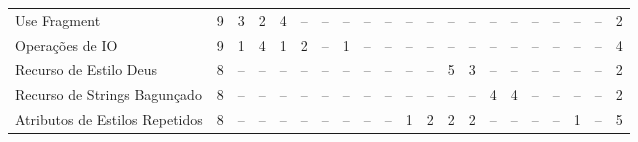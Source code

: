 \begin{table*}[t]
\begin{tabular}{@{}p{3.8cm}p{0.3cm}p{.2cm}p{.2cm}p{.2cm}p{.2cm}p{.2cm}p{.2cm}p{.2cm}p{.2cm}p{.2cm}p{.4cm}p{.4cm}p{.4cm}p{.4cm}p{.4cm}p{.4cm}p{.4cm}p{.4cm}p{.4cm}p{0.2cm}@{}}
Use Fragment					& \multicolumn{1}{c}{9} 	& \multicolumn{1}{c}{3} 	& \multicolumn{1}{c}{2} 	& \multicolumn{1}{c}{4}	 	& \multicolumn{1}{c}{--} 	& \multicolumn{1}{c}{--} 	& \multicolumn{1}{c}{--} 	& \multicolumn{1}{c}{--} 	& \multicolumn{1}{c}{--} 	& \multicolumn{1}{c}{--} 	& \multicolumn{1}{c}{--} 	& \multicolumn{1}{c}{--} 	& \multicolumn{1}{c}{--} 	& \multicolumn{1}{c}{--} 	& \multicolumn{1}{c}{--} 	& \multicolumn{1}{c}{--}	& \multicolumn{1}{c}{--} 	& \multicolumn{1}{c}{--} 	& \multicolumn{1}{c}{--} 	& \multicolumn{1}{c}{2} \\
Operações de IO					& \multicolumn{1}{c}{9} 	& \multicolumn{1}{c}{1} 	& \multicolumn{1}{c}{4} 	& \multicolumn{1}{c}{1}	 	& \multicolumn{1}{c}{2} 	& \multicolumn{1}{c}{--} 	& \multicolumn{1}{c}{1} 	& \multicolumn{1}{c}{--} 	& \multicolumn{1}{c}{--} 	& \multicolumn{1}{c}{--} 	& \multicolumn{1}{c}{--} 	& \multicolumn{1}{c}{--} 	& \multicolumn{1}{c}{--} 	& \multicolumn{1}{c}{--} 	& \multicolumn{1}{c}{--} 	& \multicolumn{1}{c}{--}	& \multicolumn{1}{c}{--} 	& \multicolumn{1}{c}{--} 	& \multicolumn{1}{c}{--} 	& \multicolumn{1}{c}{4} \\
Recurso de Estilo Deus			& \multicolumn{1}{c}{8} 	& \multicolumn{1}{c}{--} 	& \multicolumn{1}{c}{--} 	& \multicolumn{1}{c}{--} 	& \multicolumn{1}{c}{--} 	& \multicolumn{1}{c}{--} 	& \multicolumn{1}{c}{--} 	& \multicolumn{1}{c}{--} 	& \multicolumn{1}{c}{--} 	& \multicolumn{1}{c}{--} 	& \multicolumn{1}{c}{--} 	& \multicolumn{1}{c}{5} 	& \multicolumn{1}{c}{3} 	& \multicolumn{1}{c}{--} 	& \multicolumn{1}{c}{--} 	& \multicolumn{1}{c}{--}	& \multicolumn{1}{c}{--} 	& \multicolumn{1}{c}{--} 	& \multicolumn{1}{c}{--} 	& \multicolumn{1}{c}{2} \\
Recurso de Strings Bagunçado	& \multicolumn{1}{c}{8} 	& \multicolumn{1}{c}{--} 	& \multicolumn{1}{c}{--} 	& \multicolumn{1}{c}{--} 	& \multicolumn{1}{c}{--} 	& \multicolumn{1}{c}{--} 	& \multicolumn{1}{c}{--} 	& \multicolumn{1}{c}{--} 	& \multicolumn{1}{c}{--} 	& \multicolumn{1}{c}{--} 	& \multicolumn{1}{c}{--} 	& \multicolumn{1}{c}{--} 	& \multicolumn{1}{c}{--} 	& \multicolumn{1}{c}{4} 	& \multicolumn{1}{c}{4} 	& \multicolumn{1}{c}{--}	& \multicolumn{1}{c}{--} 	& \multicolumn{1}{c}{--} 	& \multicolumn{1}{c}{--} 	& \multicolumn{1}{c}{2} \\
Atributos de Estilos Repetidos	& \multicolumn{1}{c}{8} 	& \multicolumn{1}{c}{--} 	& \multicolumn{1}{c}{--} 	& \multicolumn{1}{c}{--} 	& \multicolumn{1}{c}{--} 	& \multicolumn{1}{c}{--} 	& \multicolumn{1}{c}{--} 	& \multicolumn{1}{c}{--} 	& \multicolumn{1}{c}{--} 	& \multicolumn{1}{c}{1} 	& \multicolumn{1}{c}{2} 	& \multicolumn{1}{c}{2} 	& \multicolumn{1}{c}{2} 	& \multicolumn{1}{c}{--} 	& \multicolumn{1}{c}{--} 	& \multicolumn{1}{c}{--}	& \multicolumn{1}{c}{--} 	& \multicolumn{1}{c}{1} 	& \multicolumn{1}{c}{--} 	& \multicolumn{1}{c}{5} \\


\end{tabular}
\end{table*}

